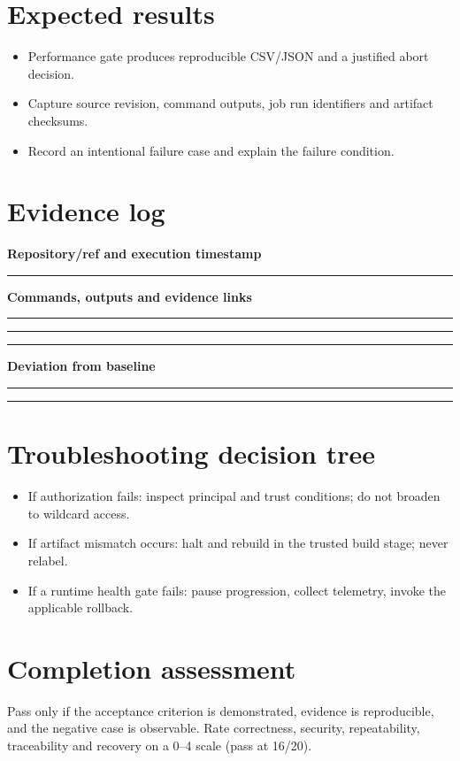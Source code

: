 \documentclass[10pt,letterpaper]{article}
\begin{document}
\section{Expected results}
\begin{itemize}
\item Performance gate produces reproducible CSV/JSON and a justified abort decision.
\item Capture source revision, command outputs, job run identifiers and artifact checksums.
\item Record an intentional failure case and explain the failure condition.
\end{itemize}

\section{Evidence log}
\textbf{Repository/ref and execution timestamp}\par
\noindent\rule{\linewidth}{0.35pt}\par\vspace{0.7em}
\textbf{Commands, outputs and evidence links}\par
\noindent\rule{\linewidth}{0.35pt}\par\vspace{0.7em}
\noindent\rule{\linewidth}{0.35pt}\par\vspace{0.7em}
\noindent\rule{\linewidth}{0.35pt}\par\vspace{0.7em}
\textbf{Deviation from baseline}\par
\noindent\rule{\linewidth}{0.35pt}\par\vspace{0.7em}
\noindent\rule{\linewidth}{0.35pt}\par\vspace{0.7em}

\section{Troubleshooting decision tree}
\begin{itemize}
\item If authorization fails: inspect principal and trust conditions; do not broaden to wildcard access.
\item If artifact mismatch occurs: halt and rebuild in the trusted build stage; never relabel.
\item If a runtime health gate fails: pause progression, collect telemetry, invoke the applicable rollback.
\end{itemize}

\section{Completion assessment}
Pass only if the acceptance criterion is demonstrated, evidence is reproducible, and the negative case is observable. Rate correctness, security, repeatability, traceability and recovery on a 0--4 scale (pass at 16/20).
\end{document}
